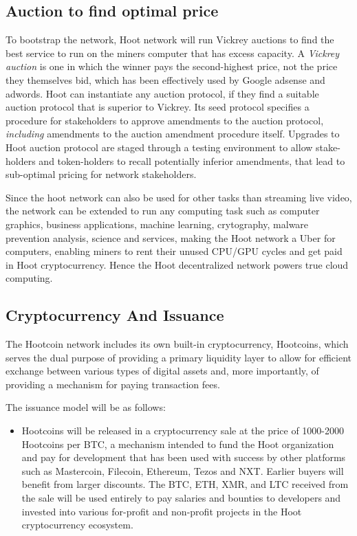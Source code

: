 \documentclass{article}
\begin{document}
\subsection{Auction to find optimal price}
To bootstrap the network, Hoot network will run Vickrey auctions to find the best service to run on the miners computer that has excess capacity. A \emph{Vickrey auction} is one in which the winner pays the second-highest price, not the price they themselves bid, which has been effectively used by Google adsense and adwords.
Hoot can instantiate any auction protocol, if they find a suitable auction protocol that is superior to Vickrey. Its seed protocol specifies a procedure for stakeholders to approve amendments to the auction protocol,
\emph{including} amendments to the auction amendment procedure
itself. Upgrades to Hoot auction protocol are staged through a testing
environment to allow stake-holders and token-holders to recall potentially inferior
amendments, that lead to sub-optimal pricing for network
stakeholders. 

Since the hoot network can also be used for other tasks than streaming live video, the network can be extended to run any computing task such as computer graphics, business applications, machine learning, crytography, malware prevention analysis, science and services, making the Hoot network a Uber for computers, enabling miners to rent their unused CPU/GPU cycles and get paid in Hoot cryptocurrency. Hence the Hoot decentralized network powers true cloud computing.

\subsection{Cryptocurrency And Issuance}

The Hootcoin network includes its own built-in cryptocurrency, Hootcoins, which serves the dual purpose of providing a primary liquidity layer to allow for efficient exchange between various types of digital assets and, more importantly, of providing a mechanism for paying transaction fees.

The issuance model will be as follows:

\begin{itemize}

\item Hootcoins will be released in a cryptocurrency sale at the price of 1000-2000 Hootcoins per BTC, a mechanism intended to fund the Hoot organization and pay for development that has been used with success by other platforms such as Mastercoin, Filecoin, Ethereum, Tezos and NXT. Earlier buyers will benefit from larger discounts. The BTC, ETH, XMR, and LTC received from the sale will be used entirely to pay salaries and bounties to developers and invested into various for-profit and non-profit projects in the Hoot cryptocurrency ecosystem.

\end{itemize}
\end{document}
